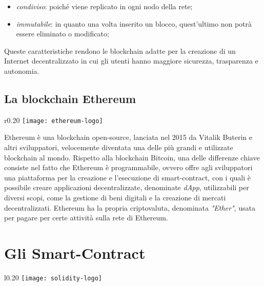 \begin{itemize}
	\item \textit{condiviso}: poiché viene replicato in ogni nodo della rete;
	\item \textit{immutabile}: in quanto una volta inserito un blocco, quest'ultimo non potrà essere eliminato o modificato;
\end{itemize}

Queste caratteristiche rendono le blockchain adatte per la creazione di un Internet decentralizzato in cui gli utenti hanno maggiore sicurezza, trasparenza e autonomia.

\subsection{La blockchain Ethereum}

\begin{wrapfigure}{r}{0.20\textwidth}
	\centering
	\texttt{[image: ethereum-logo]}
\end{wrapfigure}

Ethereum\cite{ethereum} è una blockchain open-source, lanciata nel 2015 da Vitalik Buterin e altri sviluppatori, velocemente diventata una delle più grandi e utilizzate blockchain al mondo. Rispetto alla blockchain Bitcoin, una delle differenze chiave consiste nel fatto che Ethereum è programmabile, ovvero offre agli sviluppatori una piattaforma per la creazione e l'esecuzione di smart-contract, con i quali è possibile creare applicazioni decentralizzate, denominate \textit{dApp}, utilizzabili per diversi scopi, come la gestione di beni digitali e la creazione di mercati decentralizzati. Ethereum ha la propria criptovaluta, denominata \textit{"Ether"}, usata per pagare per certe attività sulla rete di Ethereum.

\section{Gli Smart-Contract}

\begin{wrapfigure}{l}{0.20\textwidth}
	\centering
	\texttt{[image: solidity-logo]}
\end{wrapfigure}

